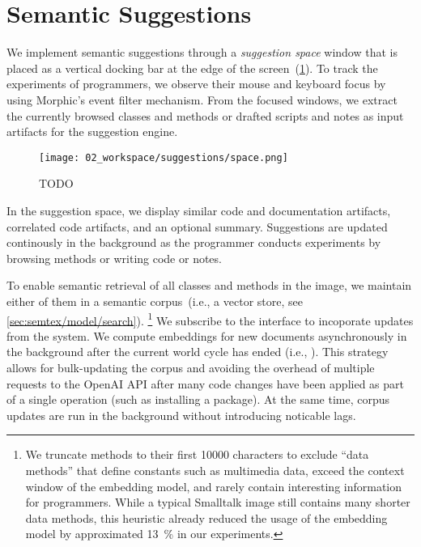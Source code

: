 
\section{Semantic Suggestions}
\label{sec:implementation/suggestions}

We implement semantic suggestions through a \emph{suggestion space} window that is placed as a vertical docking bar at the edge of the screen~(\cref{fig:implementation/suggestions/space}).
To track the experiments of programmers, we observe their mouse and keyboard focus by using Morphic's event filter mechanism.
From the focused windows, we extract the currently browsed classes and methods or drafted scripts and notes as input artifacts for the suggestion engine.

\begin{figure}
	\centering
	\texttt{[image: 02\_workspace/suggestions/space.png]}
	\caption[TODO]{
		TODO
	}
	\label{fig:implementation/suggestions/space}
\end{figure}

In the suggestion space, we display similar code and documentation artifacts, correlated code artifacts, and an optional summary.
Suggestions are updated continously in the background as the programmer conducts experiments by browsing methods or writing code or notes.

To enable semantic retrieval of all classes and methods in the image, we maintain either of them in a semantic corpus~(i.e., a vector store, see \cref{sec:semtex/model/search}).
\footnote{We truncate methods to their first \num{10000} characters to exclude ``data methods'' that define constants such as multimedia data, exceed the context window of the embedding model, and rarely contain interesting information for programmers. While a typical Smalltalk image still contains many shorter data methods, this heuristic already reduced the usage of the embedding model by approximated \qty{13}{\percent} in our experiments.}
We subscribe to the  interface to incoporate updates from the system.
We compute embeddings for new documents asynchronously in the background after the current world cycle has ended (i.e., ).
This strategy allows for bulk-updating the corpus and avoiding the overhead of multiple requests to the OpenAI API after many code changes have been applied as part of a single operation (such as installing a package).
At the same time, corpus updates are run in the background without introducing noticable lags.
